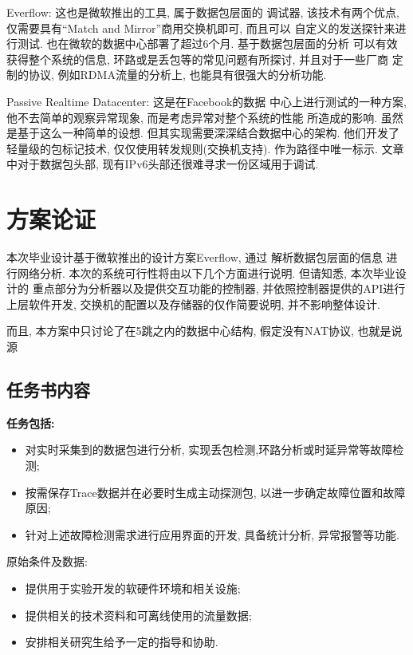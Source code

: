 {\begin{mdframed}[everyline=true]
Everflow:  这也是微软推出的工具,
属于数据包层面的 调试器, 该技术有两个优点, 仅需要具有``Match and
Mirror''商用交换机即可, 而且可以 自定义的发送探针来进行测试.
也在微软的数据中心部署了超过6个月. 基于数据包层面的分析
可以有效获得整个系统的信息, 环路或是丢包等的常见问题有所探讨,
并且对于一些厂商 定制的协议, 例如RDMA流量的分析上,
也能具有很强大的分析功能.

Passive Realtime Datacenter:  这是在Facebook的数据
中心上进行测试的一种方案, 他不去简单的观察异常现象,
而是考虑异常对整个系统的性能 所造成的影响. 虽然是基于这么一种简单的设想.
但其实现需要深深结合数据中心的架构. 他们开发了轻量级的包标记技术,
仅仅使用转发规则(交换机支持). 作为路径中唯一标示. 文章中对于数据包头部,
现有IPv6头部还很难寻求一份区域用于调试.



\section{方案论证}

本次毕业设计基于微软推出的设计方案Everflow,
通过 解析数据包层面的信息 进行网络分析.
本次的系统可行性将由以下几个方面进行说明. 但请知悉, 本次毕业设计的
重点部分为分析器以及提供交互功能的控制器,
并依照控制器提供的API进行上层软件开发,
交换机的配置以及存储器的仅作简要说明, 并不影响整体设计.

而且, 本方案中只讨论了在5跳之内的数据中心结构, 假定没有NAT协议,
也就是说源

\subsection{任务书内容}

\textbf{任务包括:}
\begin{itemize}
    \setlength\itemsep{0.1em}
    \item 对实时采集到的数据包进行分析, 实现丢包检测,环路分析或时延异常等故障检测;
    \item 按需保存Trace数据并在必要时生成主动探测包, 以进一步确定故障位置和故障原因;
    \item 针对上述故障检测需求进行应用界面的开发, 具备统计分析, 异常报警等功能.
\end{itemize}

原始条件及数据:
\begin{itemize}
    \setlength\itemsep{0.1em}
    \item 提供用于实验开发的软硬件环境和相关设施;
    \item 提供相关的技术资料和可离线使用的流量数据;
    \item 安排相关研究生给予一定的指导和协助.
\end{itemize}


\end{mdframed}}
